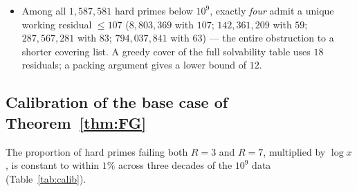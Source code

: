 \documentclass[11pt]{article}
\theoremstyle{plain}
\theoremstyle{remark}
\theoremstyle{plain}
\numberwithin{equation}{section}
\begin{document}
\begin{itemize}
  the complete $10^9$ solvability masks and a single deep-tail
  correlation factor calibrated on the $R > 83$ counts; it is a
  heuristic, not a theorem, and its role is to make falsifiable
  predictions. Below $10^{10}$ no prime had
  minimal $R \in \{87, 91, 95, 99, 103\}$; the model
  attributed this gap to small-number statistics (expected counts
  $\le 0.12$ per value at $10^9$) and predicted that deep-tail primes
  (failing every $R \le 83$) land at $87, 91, 95, 99, 103, \ge 107$
  with probabilities $0.53, 0.11, 0.22, 0.03, 0.05, 0.06$ (the last
  being the total mass at or beyond $107$). Between
  $10^{10}$ and $10^{11}$ the five values acquired $8, 3, 5, 1, 1$
  primes respectively (all in $(1.3 \times 10^{10}, 10^{11})$), and
  none passed
  $103$; that distribution was \emph{consistent} with the prediction
  ($\chi^2 \approx 1.3$) but, on $19$ points with several expected
  cells below $5$, had little power to discriminate. The model's
  sharper commitment was about \emph{when the record would move}:
  the mass at or beyond $107$ was put at $6\%$ per deep-tail prime,
  which with the deep-tail growth rate places the first
  record-breaking prime in the decade $10^{11}$--$10^{12}$. It broke
  there, at $R = 111$. The deep tail now holds $72$ primes with
  $R_{\min} \ge 87$ against $19$ a decade earlier, distributed
  $40, 5, 12, 4, 5, 4, 3$ over $87, \dots, 111$. A model fitted at
  $10^9$ thus predicted, before the computation, both the filling of
  a band that was empty at the time and the decade in which the
  maximum would move for the first time in five orders of magnitude.
\item Among all $1{,}587{,}581$ hard primes below $10^9$, exactly
  \emph{four} admit a unique working residual $\le 107$
  ($8{,}803{,}369$ with $107$; $142{,}361{,}209$ with $59$;
  $287{,}567{,}281$ with $83$; $794{,}037{,}841$ with $63$) --- the entire
  obstruction to a shorter covering list. A greedy cover of the full
  solvability table uses $18$ residuals; a packing argument gives a lower
  bound of $12$.
\end{itemize}

\subsection{Calibration of the base case of Theorem~\ref{thm:FG}}\label{sec:calib}

The proportion of hard primes failing both $R = 3$ and $R = 7$, multiplied
by $\log x$, is constant to within $1\%$ across three decades of the
$10^9$ data (Table~\ref{tab:calib}).
\end{document}
